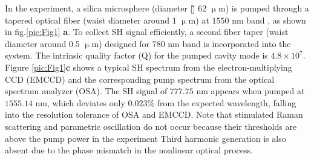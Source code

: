 \documentclass[a4paper,8pt,hyperref, twocolumn]{article}
\begin{document}
In the experiment, a silica microsphere (diameter [\~] $62$ $\upmu$m) 
is pumped through a tapered optical fiber (waist diameter around $1$ $\upmu$m) at $1550$ nm band \cite{knight1997phase, cai2000observation}, as shown in fig.\ref{pic:Fig1} \textbf{a}. To collect SH signal efficiently, a second fiber taper (waist diameter around 0.5 $\upmu$m) designed for 780 nm band is incorporated into the system. The intrinsic quality factor (Q) for the pumped cavity mode is $4.8\times10^7$. %
Figure \ref{pic:Fig1}\textbf{c} shows a typical SH spectrum from the electron-multiplying CCD (EMCCD) and the corresponding pump spectrum from the optical spectrum analyzer (OSA). The SH signal of $777.75$ nm appears when pumped at $1555.14$ nm, which deviates only $0.023$\% from the expected wavelength, falling into the resolution tolerance of OSA and EMCCD.
Note that stimulated Raman scattering and parametric oscillation do not occur because their thresholds are above the pump power in the experiment%
Third harmonic generation is also absent due to the phase mismatch in the nonlinear optical process.
\end{document}
